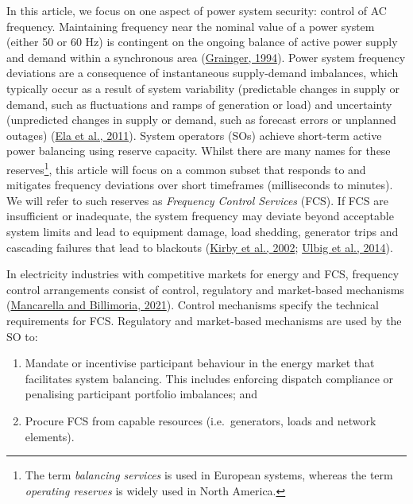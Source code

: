 \documentclass[12pt,a4paper,]{report}
\begin{document}
In this article, we focus on one aspect of power system security:
control of AC frequency. Maintaining frequency near the nominal value of
a power system (either 50 or 60 Hz) is contingent on the ongoing balance
of active power supply and demand within a synchronous area
(\protect\hyperlink{ref-graingerPowerSystemAnalysis1994}{Grainger,
1994}). Power system frequency deviations are a consequence of
instantaneous supply-demand imbalances, which typically occur as a
result of system variability (predictable changes in supply or demand,
such as fluctuations and ramps of generation or load) and uncertainty
(unpredicted changes in supply or demand, such as forecast errors or
unplanned outages)
(\protect\hyperlink{ref-elaOperatingReservesVariable2011}{Ela et al.,
2011}). System operators (SOs) achieve short-term active power balancing
using reserve capacity. Whilst there are many names for these
reserves\footnote{The term \emph{balancing services} is used in European
  systems, whereas the term \emph{operating reserves} is widely used in
  North America.}, this article will focus on a common subset that
responds to and mitigates frequency deviations over short timeframes
(milliseconds to minutes). We will refer to such reserves as
\emph{Frequency Control Services} (FCS). If FCS are insufficient or
inadequate, the system frequency may deviate beyond acceptable system
limits and lead to equipment damage, load shedding, generator trips and
cascading failures that lead to blackouts
(\protect\hyperlink{ref-kirbyFrequencyControlConcerns2002}{Kirby et al.,
2002}; \protect\hyperlink{ref-ulbigImpactLowRotational2014}{Ulbig et
al., 2014}).

In electricity industries with competitive markets for energy and FCS,
frequency control arrangements consist of control, regulatory and
market-based mechanisms
(\protect\hyperlink{ref-mancarellaFragileGridPhysics2021}{Mancarella and
Billimoria, 2021}). Control mechanisms specify the technical
requirements for FCS. Regulatory and market-based mechanisms are used by
the SO to:

\begin{enumerate}
\def\labelenumi{\arabic{enumi}.}
\item
  Mandate or incentivise participant behaviour in the energy market that
  facilitates system balancing. This includes enforcing dispatch
  compliance or penalising participant portfolio imbalances; and
\item
  Procure FCS from capable resources (i.e.~generators, loads and network
  elements).
\end{enumerate}
\end{document}
